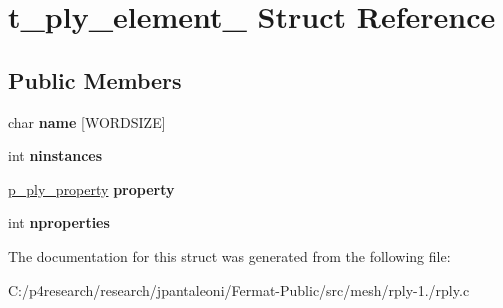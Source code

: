 \hypertarget{structt__ply__element__}{}\section{t\+\_\+ply\+\_\+element\+\_\+ Struct Reference}
\label{structt__ply__element__}
\subsection*{Public Members}
\begin{DoxyCompactItemize}
\item 
\mbox{\label{structt__ply__element___a4190e367a648df18c038ef3cbe80e266}} 
char {\bfseries name} \mbox{[}W\+O\+R\+D\+S\+I\+ZE\mbox{]}
\item 
\mbox{\label{structt__ply__element___adade36f58aa82cf10f5ce903ef4d3d93}} 
int {\bfseries ninstances}
\item 
\mbox{\label{structt__ply__element___adf2e07d9d09ac4c1152c396f88bf8ddc}} 
\hyperlink{structt__ply__property__}{p\+\_\+ply\+\_\+property} {\bfseries property}
\item 
\mbox{\label{structt__ply__element___a23a802dedc1d4800d2908c945ae6338c}} 
int {\bfseries nproperties}
\end{DoxyCompactItemize}


The documentation for this struct was generated from the following file\+:\begin{DoxyCompactItemize}
\item 
C\+:/p4research/research/jpantaleoni/\+Fermat-\/\+Public/src/mesh/rply-\/1./rply.\+c\end{DoxyCompactItemize}
